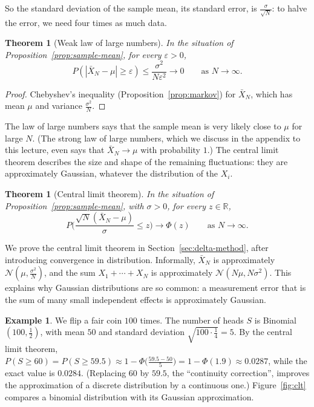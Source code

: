 \documentclass[11pt]{article}
\theoremstyle{definition}
\newtheorem{example}[definition]{Example}
\theoremstyle{plain}
\newtheorem{theorem}[definition]{Theorem}
\theoremstyle{remark}
\begin{document}
So the standard deviation of the sample mean, its standard error, is $\frac{\sigma}{\sqrt{N}}$: to halve the error, we need four times as much data.

\begin{theorem}[Weak law of large numbers]\label{thm:lln}
    In the situation of Proposition~\ref{prop:sample-mean}, for every $\varepsilon > 0$,
    \[P(|\bar X_N - \mu| \geq \varepsilon) \leq \frac{\sigma^2}{N\varepsilon^2} \to 0 \qquad \text{as } N \to \infty.\]
\end{theorem}

\begin{proof}
    Chebyshev's inequality (Proposition~\ref{prop:markov}) for $\bar X_N$, which has mean $\mu$ and variance $\frac{\sigma^2}{N}$.
\end{proof}

The law of large numbers says that the sample mean is very likely close to $\mu$ for large $N$. (The strong law of large numbers, which we discuss in the appendix to this lecture, even says that $\bar X_N \to \mu$ with probability $1$.) The central limit theorem describes the size and shape of the remaining fluctuations: they are approximately Gaussian, whatever the distribution of the $X_i$.

\begin{theorem}[Central limit theorem]\label{thm:clt}
    In the situation of Proposition~\ref{prop:sample-mean}, with $\sigma > 0$, for every $z \in \mathbb{R}$,
    \[P\Big(\frac{\sqrt{N}(\bar X_N - \mu)}{\sigma} \leq z\Big) \to \Phi(z) \qquad \text{as } N \to \infty.\]
\end{theorem}

We prove the central limit theorem in Section~\ref{sec:delta-method}, after introducing convergence in distribution. Informally, $\bar X_N$ is approximately $\mathcal{N}(\mu, \frac{\sigma^2}{N})$, and the sum $X_1 + \cdots + X_N$ is approximately $\mathcal{N}(N\mu, N\sigma^2)$. This explains why Gaussian distributions are so common: a measurement error that is the sum of many small independent effects is approximately Gaussian.

\begin{example}\label{ex:clt-coins}
    We flip a fair coin $100$ times. The number of heads $S$ is Binomial$(100, \frac{1}{2})$, with mean $50$ and standard deviation $\sqrt{100 \cdot \frac{1}{4}} = 5$. By the central limit theorem, $P(S \geq 60) = P(S \geq 59.5) \approx 1 - \Phi\big(\frac{59.5 - 50}{5}\big) = 1 - \Phi(1.9) \approx 0.0287$, while the exact value is $0.0284$. (Replacing $60$ by $59.5$, the ``continuity correction'', improves the approximation of a discrete distribution by a continuous one.) Figure~\ref{fig:clt} compares a binomial distribution with its Gaussian approximation.
\end{example}
\end{document}
